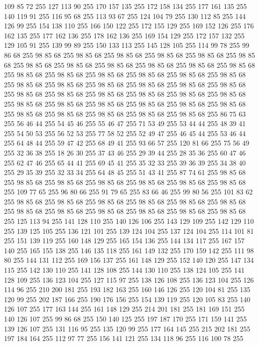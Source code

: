 109 85 72 255 127 113 90 255 170 157 135 255 172 158 134 255 177 161 135 255 140 119 91 255 116 95 68 255 113 93 67 255 124 104 79 255 130 112 85 255 144 126 99 255 154 138 110 255 166 150 122 255 172 155 129 255 169 152 126 255 176 162 135 255 177 162 136 255 178 162 136 255 169 154 129 255 172 157 132 255 129 105 91 255 139 99 89 255 150 133 113 255 145 128 105 255 114 99 78 255 99 86 68 255 98 85 68 255 98 85 68 255 98 85 68 255 98 85 68 255 98 85 68 255 98 85 68 255 98 85 68 255 98 85 68 255 98 85 68 255 98 85 68 255 98 85 68 255 98 85 68 255 98 85 68 255 98 85 68 255 98 85 68 255 98 85 68 255 98 85 68 255 98 85 68 255 98 85 68 255 98 85 68 255 98 85 68 255 98 85 68 255 98 85 68 255 98 85 68 255 98 85 68 255 98 85 68 255 98 85 68 255 98 85 68 255 98 85 68 255 98 85 68 255 98 85 68 255 98 85 68 255 98 85 68 255 98 85 68 255 98 85 68 255 98 85 68 255 98 85 68 255 98 85 68 255
98 85 68 255 98 85 68 255 98 85 68 255 86 75 63 255 56 46 44 255 54 45 46 255 55 46 47 255 71 53 49 255 53 44 44 255 48 39 41 255 54 50 53 255 56 52 53 255 77 58 52 255 52 49 47 255 46 45 44 255 53 46 44 255 64 48 44 255 59 47 42 255 68 49 41 255 93 66 57 255 120 81 66 255 75 56 49 255 32 36 38 255 18 26 30 255 37 43 46 255 29 39 44 255 28 35 36 255 60 47 46 255 62 47 46 255 65 44 41 255 69 45 41 255 35 32 33 255 39 36 39 255 34 38 40 255 29 35 39 255 32 33 34 255 64 48 45 255 51 43 41 255 87 74 61 255 98 85 68 255 98 85 68 255 98 85 68 255 98 85 68 255 98 85 68 255 98 85 68 255 98 85 68 255 109 77 65 255 96 80 66 255 91 79 65 255 83 66 46 255 99 80 56 255 101 83 62 255 98 85 68 255 98 85 68 255 98 85 68 255 98 85 68 255 98 85 68 255 98 85 68 255 98 85 68 255 98 85 68 255 98 85 68 255 98 85 68 255 98 85 68 255 98 85 68 255
125 113 94 255 141 128 110 255 140 126 106 255 143 129 109 255 142 129 110 255 139 125 105 255 136 121 101 255 139 124 104 255 137 124 104 255 114 101 81 255 151 139 119 255 160 148 129 255 165 154 136 255 144 134 117 255 167 157 140 255 165 155 138 255 146 135 118 255 161 149 132 255 170 159 142 255 111 98 80 255 144 131 112 255 169 156 137 255 161 148 129 255 152 140 120 255 147 134 115 255 142 130 110 255 141 128 108 255 144 130 110 255 138 124 105 255 141 128 109 255 136 123 104 255 127 115 97 255 138 126 108 255 136 123 104 255 126 114 96 255 210 200 181 255 193 182 163 255 160 146 126 255 120 104 81 255 135 120 99 255 202 187 166 255 190 176 156 255 154 139 119 255 120 105 83 255 140 126 107 255 177 163 144 255 161 148 129 255 214 201 181 255 181 169 151 255 140 126 107 255 99 86 68 255 150 140 125 255 197 187 170 255 171 159 141 255 139 126 107 255 131 116 95 255 135 120 99 255 177 164 145 255 215 202 181 255 197 184 164 255 112 97 77 255 156 141 121 255 134 118 96 255 116 100 78 255
